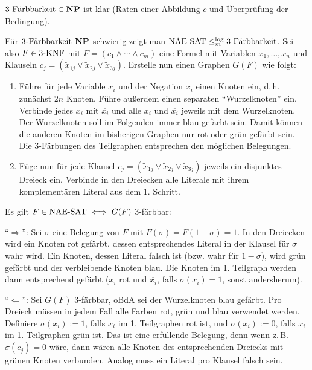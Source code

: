 \begin{Beweis}
    $\kFaerbbarkeit{3} \in \NP$ ist klar (Raten einer Abbildung $c$ und Überprüfung der Bedingung).

    Für $\kFaerbbarkeit{3}$ $\NP$-schwierig zeigt man $\NAESAT \le_m^{\log} \kFaerbbarkeit{3}$.
    Sei also $F \in \kKNF{3}$ mit $F = (c_1 \land \dotsb \land c_m)$ eine Formel
    mit Variablen $x_1, \dotsc, x_n$ und Klauseln
    $c_j = (\widetilde{x}_{1j} \lor \widetilde{x}_{2j} \lor \widetilde{x}_{3j})$.
    Erstelle nun einen Graphen $G(F)$ wie folgt:
    \begin{enumerate}
        \item
        Führe für jede Variable $x_i$ und der Negation $\overline{x_i}$ einen Knoten ein,
        d.\,h. zunächst $2n$ Knoten.
        Führe außerdem einen separaten "`Wurzelknoten"' ein.
        Verbinde jedes $x_i$ mit $\overline{x_i}$ und alle $x_i$ und $\overline{x_i}$ jeweils mit
        dem Wurzelknoten.
        Der Wurzelknoten soll im Folgenden immer blau gefärbt sein.
        Damit können die anderen Knoten im bisherigen Graphen nur rot oder grün gefärbt sein.
        Die 3-Färbungen des Teilgraphen entsprechen den möglichen Belegungen.

        \item
        Füge nun für jede Klausel
        $c_j = (\widetilde{x}_{1j} \lor \widetilde{x}_{2j} \lor \widetilde{x}_{3j})$
        jeweils ein disjunktes Dreieck ein.
        Verbinde in den Dreiecken alle Literale mit ihrem komplementären Literal aus dem
        1. Schritt.
    \end{enumerate}
    Es gilt $F \in \NAESAT \iff G(F)$ 3-färbbar:

    "`$\Rightarrow$"':
    Sei $\sigma$ eine Belegung von $F$ mit $F(\sigma) = F(1 - \sigma) = 1$.
    In den Dreiecken wird ein Knoten rot gefärbt, dessen entsprechendes Literal in der Klausel
    für $\sigma$ wahr wird.
    Ein Knoten, dessen Literal falsch ist (bzw. wahr für $1 - \sigma$), wird grün gefärbt
    und der verbleibende Knoten blau.
    Die Knoten im 1. Teilgraph werden dann entsprechend gefärbt
    ($x_i$ rot und $\overline{x_i}$, falls $\sigma(x_i) = 1$, sonst andersherum).

    "`$\Leftarrow$"':
    Sei $G(F)$ 3-färbbar, oBdA sei der Wurzelknoten blau gefärbt.
    Pro Dreieck müssen in jedem Fall alle Farben rot, grün und blau verwendet werden.
    Definiere $\sigma(x_i) := 1$, falls $x_i$ im 1. Teilgraphen rot ist, und
    $\sigma(x_i) := 0$, falls $x_i$ im 1. Teilgraphen grün ist.
    Das ist eine erfüllende Belegung, denn wenn z.\,B. $\sigma(c_j) = 0$ wäre,
    dann wären alle Knoten des entsprechenden Dreiecks mit grünen Knoten verbunden.
    Analog muss ein Literal pro Klausel falsch sein.
\end{Beweis}


